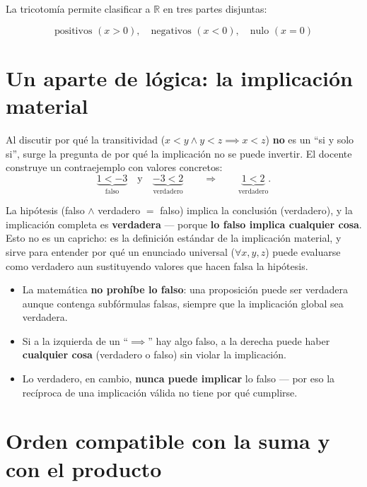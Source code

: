 \documentclass[12pt,a4paper]{article}
\begin{document}
La tricotomía permite clasificar a $\mathbb{R}$ en tres partes disjuntas:

\begin{keybox}
\[
\boxed{\text{positivos } (x>0), \quad \text{negativos } (x<0), \quad \text{nulo } (x=0)}
\]
\end{keybox}

\section{Un aparte de lógica: la implicación material}

Al discutir por qué la transitividad ($x<y \wedge y<z \implies x<z$)
\textbf{no} es un ``si y solo si'', surge la pregunta de por qué la
implicación no se puede invertir. El docente construye un contraejemplo con
valores concretos:
\[
\underbrace{1 < -3}_{\text{falso}} \quad \text{y} \quad \underbrace{-3 < 2}_{\text{verdadero}}
\qquad \Longrightarrow \qquad \underbrace{1<2}_{\text{verdadero}}.
\]

La hipótesis (falso $\wedge$ verdadero $=$ falso) implica la conclusión
(verdadero), y la implicación completa es \textbf{verdadera} --- porque
\textbf{lo falso implica cualquier cosa}. Esto no es un capricho: es la
definición estándar de la implicación material, y sirve para entender por
qué un enunciado universal ($\forall x,y,z$) puede evaluarse como
verdadero aun sustituyendo valores que hacen falsa la hipótesis.

\begin{notebox}
\begin{itemize}
  \item La matemática \textbf{no prohíbe lo falso}: una proposición puede
    ser verdadera aunque contenga subfórmulas falsas, siempre que la
    implicación global sea verdadera.
  \item Si a la izquierda de un ``$\implies$'' hay algo falso, a la derecha
    puede haber \textbf{cualquier cosa} (verdadero o falso) sin violar la
    implicación.
  \item Lo verdadero, en cambio, \textbf{nunca puede implicar} lo falso ---
    por eso la recíproca de una implicación válida no tiene por qué
    cumplirse.
\end{itemize}
\end{notebox}

\section{Orden compatible con la suma y con el producto}
\end{document}

